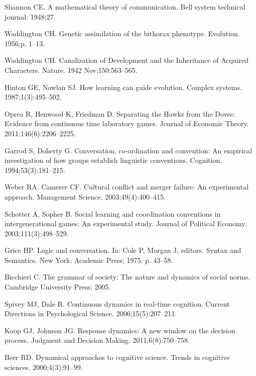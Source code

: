 \documentclass[10pt,letterpaper]{article}
\begin{document}
\begin{thebibliography}{10}
Shannon CE.
\newblock A mathematical theory of communication.
\newblock Bell system technical journal. 1948;27.

Waddington CH.
\newblock Genetic assimilation of the bithorax phenotype.
\newblock Evolution. 1956;p. 1--13.

Waddington CH.
\newblock Canalization of Development and the Inheritance of Acquired
  Characters.
\newblock Nature. 1942 Nov;150:563--565.

Hinton GE, Nowlan SJ.
\newblock How learning can guide evolution.
\newblock Complex systems. 1987;1(3):495--502.

Oprea R, Henwood K, Friedman D.
\newblock Separating the Hawks from the Doves: Evidence from continuous time
  laboratory games.
\newblock Journal of Economic Theory. 2011;146(6):2206--2225.

Garrod S, Doherty G.
\newblock Conversation, co-ordination and convention: An empirical
  investigation of how groups establish linguistic conventions.
\newblock Cognition. 1994;53(3):181--215.

Weber RA, Camerer CF.
\newblock Cultural conflict and merger failure: An experimental approach.
\newblock Management Science. 2003;49(4):400--415.

Schotter A, Sopher B.
\newblock Social learning and coordination conventions in intergenerational
  games: An experimental study.
\newblock Journal of Political Economy. 2003;111(3):498--529.

Grice HP.
\newblock Logic and conversation.
\newblock In: Cole P, Morgan J, editors. Syntax and Semantics. New York:
  Academic Press; 1975. p. 43--58.

Bicchieri C.
\newblock The grammar of society: The nature and dynamics of social norms.
\newblock Cambridge University Press; 2005.

Spivey MJ, Dale R.
\newblock Continuous dynamics in real-time cognition.
\newblock Current Directions in Psychological Science. 2006;15(5):207--211.

Koop GJ, Johnson JG.
\newblock Response dynamics: A new window on the decision process.
\newblock Judgment and Decision Making. 2011;6(8):750--758.

Beer RD.
\newblock Dynamical approaches to cognitive science.
\newblock Trends in cognitive sciences. 2000;4(3):91--99.

\end{thebibliography}

\end{document}
